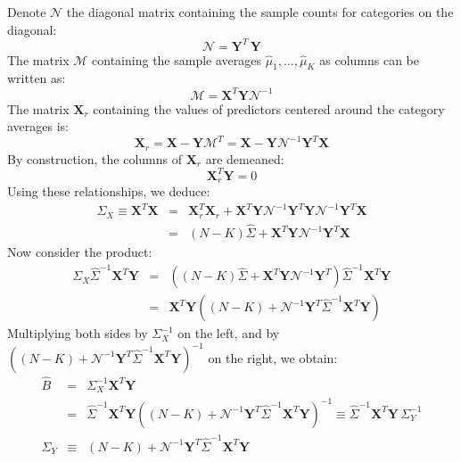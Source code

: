 

Denote $\mathcal{N}$ the diagonal matrix containing the sample counts
for categories on the diagonal:
\begin{equation*}
\mathcal{N} = \mathbf{Y}^T\,\mathbf{Y}
\end{equation*}
The matrix $\mathcal{M}$ containing the sample averages $\hat{\mu}_1, \ldots,
\hat{\mu}_K$ as columns can be written as:
\begin{equation*}
\mathcal{M} = \mathbf{X}^T \mathbf{Y} \mathcal{N}^{-1}
\end{equation*} 
The matrix $\mathbf{X}_{r}$ containing the values of predictors centered
around the category averages is:
\begin{equation*}
\mathbf{X}_r = \mathbf{X} - \mathbf{Y} \mathcal{M}^T = \mathbf{X} - \mathbf{Y}
   \mathcal{N}^{-1} \mathbf{Y}^T \mathbf{X}
\end{equation*}
By construction, the columns of $\mathbf{X}_r$ are demeaned:
\begin{equation*}
\mathbf{X}_r^T \mathbf{Y} = 0
\end{equation*}
Using these relationships, we deduce:
\begin{eqnarray*}
\Sigma_X \equiv \mathbf{X}^T \mathbf{X} & = & \mathbf{X}_r^T \mathbf{X}_r + \mathbf{X}^T \mathbf{Y}
    \mathcal{N}^{-1} \mathbf{Y}^T \mathbf{Y} \mathcal{N}^{-1} \mathbf{Y}^T \mathbf{X} \\
    & = & (N - K) \hat{\Sigma} + \mathbf{X}^T \mathbf{Y} \mathcal{N}^{-1} \mathbf{Y}^T \mathbf{X}
\end{eqnarray*}
Now consider the product:
\begin{eqnarray*}
   \Sigma_X \hat{\Sigma}^{-1} \mathbf{X}^T \mathbf{Y} & = &
    \left( (N - K) \hat{\Sigma} + \mathbf{X}^T \mathbf{Y} \mathcal{N}^{-1} \mathbf{Y}^T\right) \hat{\Sigma}^{-1}\mathbf{X}^T \mathbf{Y} \\
    & = & \mathbf{X}^T \mathbf{Y} \left((N - K) + \mathcal{N}^{-1} \mathbf{Y}^T
        \hat{\Sigma}^{-1} \mathbf{X}^T \mathbf{Y}\right)
\end{eqnarray*}
Multiplying both sides by $\Sigma_X^{-1}$ on the left, and by $\left((N - K) + \mathcal{N}^{-1} \mathbf{Y}^T
\hat{\Sigma}^{-1} \mathbf{X}^T \mathbf{Y}\right)^{-1}$ on the right, we obtain:
\begin{eqnarray} \nonumber
\hat{B} & = & \Sigma_X^{-1} \mathbf{X}^T \mathbf{Y}\\ \label{eq:4p03_1}
& = & \hat{\Sigma}^{-1} \mathbf{X}^T \mathbf{Y} \left((N - K) + \mathcal{N}^{-1} \mathbf{Y}^T
\hat{\Sigma}^{-1} \mathbf{X}^T \mathbf{Y}\right)^{-1} \equiv 
   \hat{\Sigma}^{-1} \mathbf{X}^T \mathbf{Y}\, \Sigma_Y^{-1} \\
   \Sigma_Y & \equiv & (N - K) + \mathcal{N}^{-1} \mathbf{Y}^T
   \hat{\Sigma}^{-1} \mathbf{X}^T \mathbf{Y}
\end{eqnarray}
